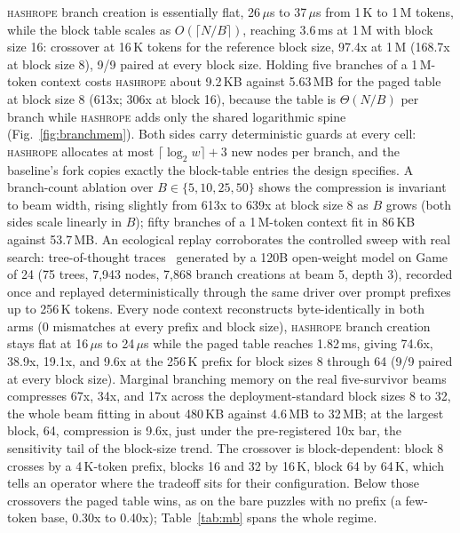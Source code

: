 \documentclass[10pt,conference]{IEEEtran}
\newcommand{\hr}{\textsc{hashrope}}
\newcommand{\ms}{\,ms}
\newcommand{\us}{\,$\mu$s}
\begin{document}
\hr{} branch creation is essentially flat, 26\us{}
to 37\us{} from 1\,K to 1\,M tokens, while the block table scales as
$O(\lceil N/B\rceil)$, reaching 3.6\ms{} at 1\,M with block size 16:
crossover at 16\,K tokens for the reference block size, 97.4x at 1\,M
(168.7x at block size 8), 9/9 paired at every block size. Holding five
branches of a 1\,M-token context costs \hr{} about 9.2\,KB against
5.63\,MB for the paged table at block size 8 (613x; 306x at block 16),
because the table is $\Theta(N/B)$ per branch while \hr{} adds only the
shared logarithmic spine (Fig.~\ref{fig:branchmem}). Both sides carry
deterministic guards at every cell: \hr{} allocates at most
$\lceil\log_2 w\rceil + 3$ new nodes per branch, and the baseline's
fork copies exactly the block-table entries the design specifies. A
branch-count ablation over $B \in \{5, 10, 25, 50\}$ shows the
compression is invariant to beam width, rising slightly from 613x to
639x at block size 8 as $B$ grows (both sides scale linearly in $B$);
fifty branches of a 1\,M-token context fit in 86\,KB against
53.7\,MB. An ecological replay corroborates the controlled sweep with
real search: tree-of-thought traces~\cite{yao2023tot} generated by a
120B open-weight model on Game of 24 (75 trees, 7{,}943 nodes,
7{,}868 branch creations at beam 5, depth 3), recorded once and
replayed deterministically through the same driver over prompt
prefixes up to 256\,K tokens. Every node context reconstructs
byte-identically in both arms (0 mismatches at every prefix and block
size), \hr{} branch creation stays flat at 16\us{} to 24\us{} while
the paged table reaches 1.82\ms{}, giving 74.6x, 38.9x, 19.1x, and
9.6x at the 256\,K prefix for block sizes 8 through 64 (9/9 paired at
every block size). Marginal branching memory on the real
five-survivor beams compresses 67x, 34x, and 17x across the
deployment-standard block sizes 8 to 32, the whole beam fitting in
about 480\,KB against 4.6\,MB to 32\,MB; at the largest block, 64,
compression is 9.6x, just under the pre-registered 10x bar, the
sensitivity tail of the block-size trend. The crossover is
block-dependent: block 8 crosses by a 4\,K-token prefix, blocks 16 and
32 by 16\,K, block 64 by 64\,K, which tells an operator where the
tradeoff sits for their configuration. Below those crossovers the
paged table wins, as on the bare puzzles with no prefix (a few-token
base, 0.30x to 0.40x); Table~\ref{tab:mb} spans the whole regime.
\end{document}
